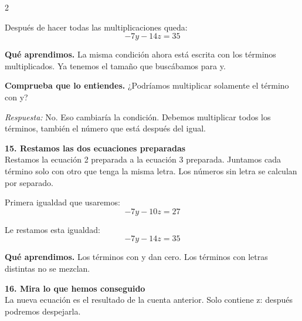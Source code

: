 \documentclass[11pt,a4paper,landscape]{article}
\begin{document}
\begin{multicols*}{2}
\begin{minipage}{\linewidth}
\par\smallskip Después de hacer todas las multiplicaciones queda:
\[-7y - 14z = 35\]
\par\smallskip\textbf{Qué aprendimos.} La misma condición ahora está escrita con los términos multiplicados. Ya tenemos el tamaño que buscábamos para y.
\par\smallskip\textbf{Comprueba que lo entiendes.} ¿Podríamos multiplicar solamente el término con y?\par\textit{Respuesta:} No. Eso cambiaría la condición. Debemos multiplicar todos los términos, también el número que está después del igual.
\end{minipage}\par\medskip
\noindent\begin{minipage}{\linewidth}\textbf{15. Restamos las dos ecuaciones preparadas}\\[2pt]Restamos la ecuación 2 preparada a la ecuación 3 preparada. Juntamos cada término solo con otro que tenga la misma letra. Los números sin letra se calculan por separado.
\par{}\par\smallskip
\par\smallskip Primera igualdad que usaremos:
\[-7y - 10z = 27\]
\par\smallskip Le restamos esta igualdad:
\[-7y - 14z = 35\]
\par\smallskip\textbf{Qué aprendimos.} Los términos con y dan cero. Los términos con letras distintas no se mezclan.
\end{minipage}\par\medskip
\noindent\begin{minipage}{\linewidth}\textbf{16. Mira lo que hemos conseguido}\\[2pt]La nueva ecuación es el resultado de la cuenta anterior. Solo contiene z: después podremos despejarla.

\end{minipage}
\end{multicols*}
\end{document}
